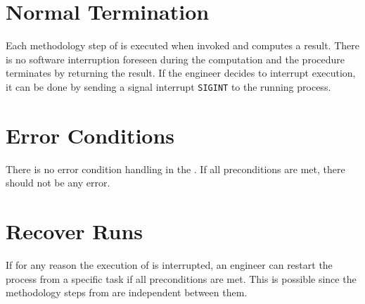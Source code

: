 

\section{Normal Termination}


Each methodology step of \MASS is executed when invoked and computes a result. There is no software interruption foreseen during the computation and the procedure terminates by returning the result.
If the engineer decides to interrupt \MASS execution, it can be done by sending a signal interrupt \texttt{SIGINT} to the running process.

\section{Error Conditions}


There is no error condition handling in the \FAQAS. If all preconditions are met, there should not be any error.

\section{Recover Runs}


If for any reason the execution of \MASS is interrupted, an engineer can restart the process from a specific task if all preconditions are met. This is possible since the methodology steps from \MASS are independent between them.
